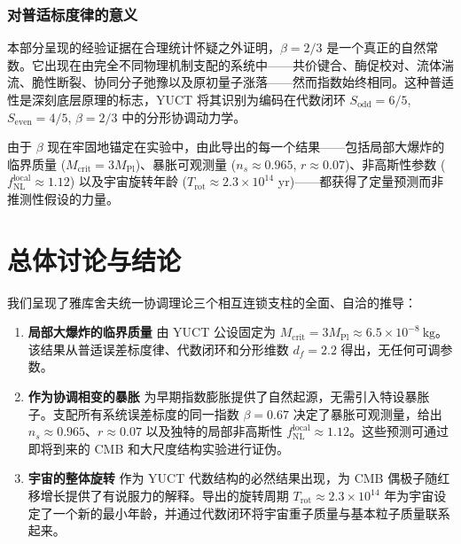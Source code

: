 \documentclass[11pt,a4paper]{article}
\begin{document}
	\section{对普适标度律的意义}
	
	本部分呈现的经验证据在合理统计怀疑之外证明，\(\beta = 2/3\) 是一个真正的自然常数。它出现在由完全不同物理机制支配的系统中——共价键合、酶促校对、流体湍流、脆性断裂、协同分子弛豫以及原初量子涨落——然而指数始终相同。这种普适性是深刻底层原理的标志，YUCT 将其识别为编码在代数闭环 \(S_{\mathrm{odd}} = 6/5\), \(S_{\mathrm{even}} = 4/5\), \(\beta = 2/3\) 中的分形协调动力学。
	
	由于 \(\beta\) 现在牢固地锚定在实验中，由此导出的每一个结果——包括局部大爆炸的临界质量 (\(M_{\mathrm{crit}} = 3M_{\mathrm{Pl}}\))、暴胀可观测量 (\(n_s \approx 0.965\), \(r \approx 0.07\))、非高斯性参数 (\(f_{\mathrm{NL}}^{\mathrm{local}} \approx 1.12\)) 以及宇宙旋转年龄 (\(T_{\mathrm{rot}} \approx 2.3\times10^{14}\) yr)——都获得了定量预测而非推测性假设的力量。
	
	
	\part{总体讨论与结论}
	\label{part:conclusion}
	
	我们呈现了雅库舍夫统一协调理论三个相互连锁支柱的全面、自洽的推导：
	
	\begin{enumerate}
		\item \textbf{局部大爆炸的临界质量} 由 YUCT 公设固定为 \(M_{\mathrm{crit}} = 3 M_{\mathrm{Pl}} \approx 6.5 \times 10^{-8}\ \text{kg}\)。该结果从普适误差标度律、代数闭环和分形维数 \(d_f = 2.2\) 得出，无任何可调参数。
		
		\item \textbf{作为协调相变的暴胀} 为早期指数膨胀提供了自然起源，无需引入特设暴胀子。支配所有系统误差标度的同一指数 \(\beta = 0.67\) 决定了暴胀可观测量，给出 \(n_s \approx 0.965\)、\(r \approx 0.07\) 以及独特的局部非高斯性 \(f_{\mathrm{NL}}^{\mathrm{local}} \approx 1.12\)。这些预测可通过即将到来的 CMB 和大尺度结构实验进行证伪。
		
		\item \textbf{宇宙的整体旋转} 作为 YUCT 代数结构的必然结果出现，为 CMB 偶极子随红移增长提供了有说服力的解释。导出的旋转周期 \(T_{\mathrm{rot}} \approx 2.3 \times 10^{14}\) 年为宇宙设定了一个新的最小年龄，并通过代数闭环将宇宙重子质量与基本粒子质量联系起来。
	\end{enumerate}
	
\end{document}
